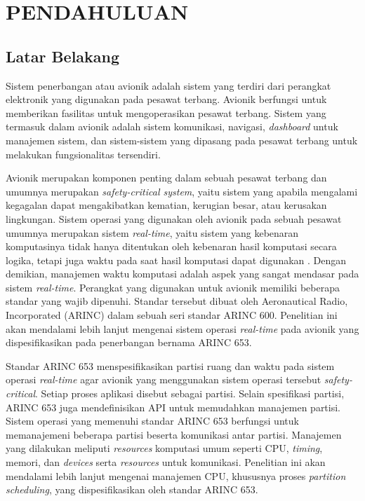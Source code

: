 \chapter{PENDAHULUAN}

\section{Latar Belakang}

Sistem penerbangan atau avionik adalah sistem yang terdiri dari perangkat elektronik yang
digunakan pada pesawat terbang. Avionik berfungsi untuk memberikan fasilitas untuk
mengoperasikan pesawat terbang. Sistem yang termasuk dalam avionik adalah sistem komunikasi,
navigasi, \textit{dashboard} untuk manajemen sistem, dan sistem-sistem yang dipasang pada
pesawat terbang untuk melakukan fungsionalitas tersendiri.

Avionik merupakan komponen penting dalam sebuah pesawat terbang dan umumnya merupakan
\textit{safety\hyp critical system}, yaitu sistem yang apabila mengalami kegagalan dapat
mengakibatkan kematian, kerugian besar, atau kerusakan lingkungan.  Sistem operasi yang
digunakan oleh avionik pada sebuah pesawat umumnya merupakan sistem \textit{real-time}, yaitu
sistem yang kebenaran komputasinya tidak hanya ditentukan oleh kebenaran hasil komputasi secara
logika, tetapi juga waktu pada saat hasil komputasi dapat digunakan \citep[p.~6]{Shin1994}.
Dengan demikian, manajemen waktu komputasi adalah aspek yang sangat mendasar pada sistem
\textit{real-time}.  Perangkat yang digunakan untuk avionik memiliki beberapa standar yang wajib
dipenuhi. Standar tersebut dibuat oleh Aeronautical Radio, Incorporated (ARINC) dalam sebuah
seri standar ARINC 600. Penelitian ini akan mendalami lebih lanjut mengenai sistem operasi
\textit{real-time} pada avionik yang dispesifikasikan pada penerbangan bernama ARINC 653.

Standar ARINC 653 menspesifikasikan partisi ruang dan waktu pada sistem operasi
\textit{real-time} agar avionik yang menggunakan sistem operasi tersebut
\textit{safety-critical}. Setiap proses aplikasi disebut sebagai partisi.  Selain spesifikasi
partisi, ARINC 653 juga mendefinisikan API untuk memudahkan manajemen partisi.  Sistem operasi
yang memenuhi standar ARINC 653 berfungsi untuk memanajemeni beberapa partisi beserta komunikasi
antar partisi.  Manajemen yang dilakukan meliputi \textit{resources} komputasi umum seperti CPU,
\textit{timing}, memori, dan \textit{devices} serta \textit{resources} untuk komunikasi.
Penelitian ini akan mendalami lebih lanjut mengenai manajemen CPU, khususnya proses
\textit{partition scheduling}, yang dispesifikasikan oleh standar ARINC 653.

